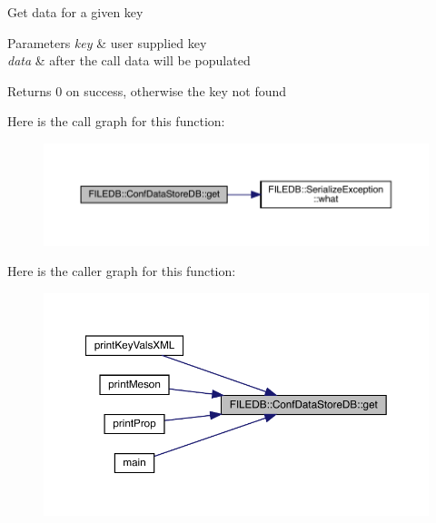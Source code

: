 Get data for a given key 
\begin{DoxyParams}{Parameters}
{\em key} & user supplied key \\
\hline
{\em data} & after the call data will be populated \\
\hline
\end{DoxyParams}
\begin{DoxyReturn}{Returns}
0 on success, otherwise the key not found 
\end{DoxyReturn}
Here is the call graph for this function\+:
\nopagebreak
\begin{figure}[H]
\begin{center}
\leavevmode
\includegraphics[width=350pt]{d8/d19/classFILEDB_1_1ConfDataStoreDB_ad89d0c1aef7c82fb0273d50bfea7cf0a_cgraph}
\end{center}
\end{figure}
Here is the caller graph for this function\+:\nopagebreak
\begin{figure}[H]
\begin{center}
\leavevmode
\includegraphics[width=350pt]{d8/d19/classFILEDB_1_1ConfDataStoreDB_ad89d0c1aef7c82fb0273d50bfea7cf0a_icgraph}
\end{center}
\end{figure}
\mbox{\label{classFILEDB_1_1ConfDataStoreDB_ad89d0c1aef7c82fb0273d50bfea7cf0a}} 
